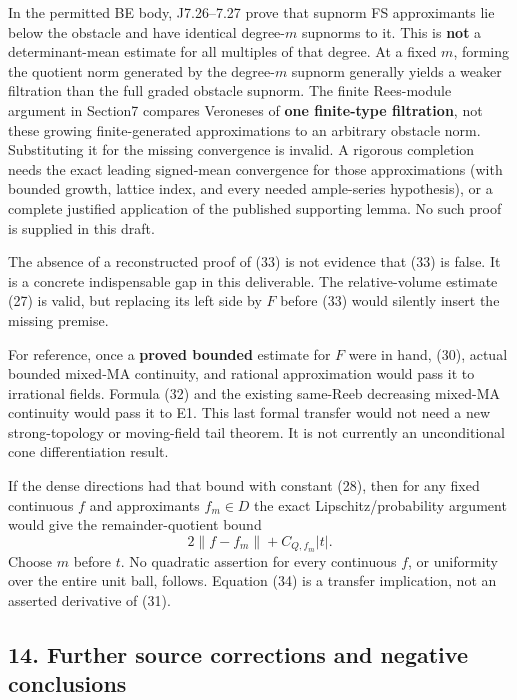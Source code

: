 \documentclass[
  11pt,
]{article}
\begin{document}
In the permitted BE body, J7.26--7.27 prove that supnorm FS approximants
lie below the obstacle and have identical degree-\(m\) supnorms to it.
This is \textbf{not} a determinant-mean estimate for all multiples of
that degree. At a fixed \(m\), forming the quotient norm generated by
the degree-\(m\) supnorm generally yields a weaker filtration than the
full graded obstacle supnorm. The finite Rees-module argument in
Section7 compares Veroneses of \textbf{one finite-type filtration}, not
these growing finite-generated approximations to an arbitrary obstacle
norm. Substituting it for the missing convergence is invalid. A rigorous
completion needs the exact leading signed-mean convergence for those
approximations (with bounded growth, lattice index, and every needed
ample-series hypothesis), or a complete justified application of the
published supporting lemma. No such proof is supplied in this draft.

The absence of a reconstructed proof of (33) is not evidence that (33)
is false. It is a concrete indispensable gap in this deliverable. The
relative-volume estimate (27) is valid, but replacing its left side by
\(F\) before (33) would silently insert the missing premise.

For reference, once a \textbf{proved bounded} estimate for \(F\) were in
hand, (30), actual bounded mixed-MA continuity, and rational
approximation would pass it to irrational fields. Formula (32) and the
existing same-Reeb decreasing mixed-MA continuity would pass it to E1.
This last formal transfer would not need a new strong-topology or
moving-field tail theorem. It is not currently an unconditional cone
differentiation result.

If the dense directions had that bound with constant (28), then for any
fixed continuous \(f\) and approximants \(f_m\in D\) the exact
Lipschitz/probability argument would give the remainder-quotient bound
\[ 2\|f-f_m\|+C_{Q,f_m}|t|.                                            \tag{34}\]
Choose \(m\) before \(t\). No quadratic assertion for every continuous
\(f\), or uniformity over the entire unit ball, follows. Equation (34)
is a transfer implication, not an asserted derivative of (31).

\subsection{14. Further source corrections and negative
conclusions}\label{further-source-corrections-and-negative-conclusions}
\end{document}
